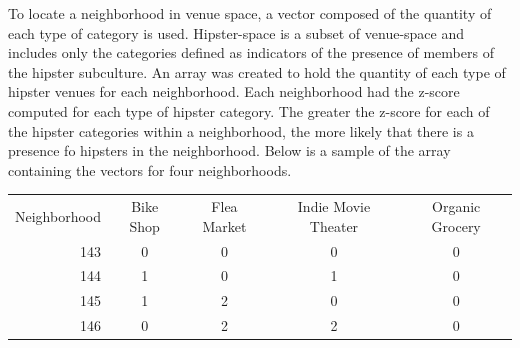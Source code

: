 \documentclass[12pt]{article}
\begin{document}
	To locate a neighborhood in venue space, a vector composed of the quantity of each type of category is used.
	Hipster-space is a subset of venue-space and includes only the categories defined as indicators of the presence of members of the hipster subculture.
	An array was created to hold the quantity of each type of hipster venues for each neighborhood.
	Each neighborhood had the z-score computed for each type of hipster category.
	The greater the z-score for each of the hipster categories within a neighborhood, the more likely that there is a presence fo hipsters in the neighborhood.
	Below is a sample of the array containing the vectors for four neighborhoods.\\
\begin{center}
\begin{tabular}{r c c c c }

Neighborhood	&Bike Shop & Flea Market  &Indie Movie Theater  &Organic Grocery\\
	143		 &0	       &0                    &0                &0\\
	144              &1            &0                    &1                &0\\
	145              &1            &2                    &0                &0\\
	146              &0            &2                    &2                &0\\
\end{tabular}
\end{center}
\end{document}
